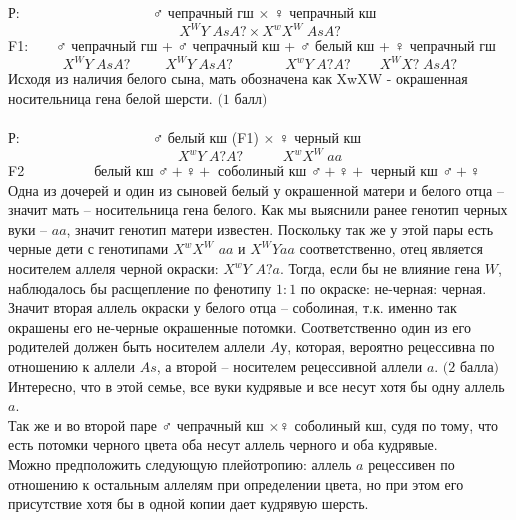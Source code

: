 Р:$\hspace{110pt}$ $\male$ чепрачный гш $\times$ $\female$ чепрачный кш
$$X^WY\hspace{3pt}AsA? \times X^wX^W\hspace{3pt}AsA?$$
F1:$\hspace{20pt}$ $\male$ чепрачный гш + $\male$ чепрачный кш + $\male$ белый кш + $\female$ чепрачный гш
$$X^WY\hspace{3pt}AsA?\hspace{30pt}X^WY\hspace{3pt}AsA?\hspace{10pt}\hspace{35pt}X^wY\hspace{3pt}A?A?\hspace{25pt}X^WX?\hspace{3pt}AsA?$$
Исходя из наличия белого сына, мать обозначена как XwXW  - окрашенная носительница гена белой шерсти. $\textit{(1 балл)}$\\\\
Р:$\hspace{110pt}$ $\male$ белый кш (F1) $\times$ $\female$ черный кш
$$X^wY\hspace{3pt}A?A?\hspace{34pt}X^wX^W\hspace{3pt}aa$$
F2$\hspace{60pt}$белый кш $\male+\female+$ соболиный кш $\male+\female+$ черный кш $\male+\female$\\
Одна из дочерей и один из сыновей белый у окрашенной матери и белого отца – значит мать – носительница гена белого. Как мы выяснили ранее генотип черных вуки – $aa$, значит генотип матери известен. Поскольку так же у этой пары есть черные дети с генотипами $X^wX^W$ $aa$ и $X^WYaa$ соответственно, отец является носителем аллеля черной окраски: $X^wY$ $A?a$. Тогда, если бы не влияние гена $W$, наблюдалось бы расщепление по фенотипу $1:1$ по окраске: не-черная: черная. Значит вторая аллель окраски у белого отца – соболиная, т.к. именно так окрашены его не-черные окрашенные потомки. Соответственно один из его родителей должен быть носителем аллели $Aу$, которая, вероятно рецессивна по отношению к аллели $As$, а второй – носителем рецессивной аллели $a$. $\textit{(2 балла)}$\\
Интересно, что в этой семье, все вуки кудрявые и все несут хотя бы одну аллель $a$.\\
Так же и во второй паре $\male$ чепрачный кш $\times\female$ соболиный кш, судя по тому, что есть потомки черного цвета оба несут  аллель черного и оба кудрявые.\\ Можно предположить следующую плейотропию: аллель $a$ рецессивен по отношению к остальным аллелям при определении цвета, но при этом его присутствие хотя бы в одной копии дает кудрявую шерсть.\\
